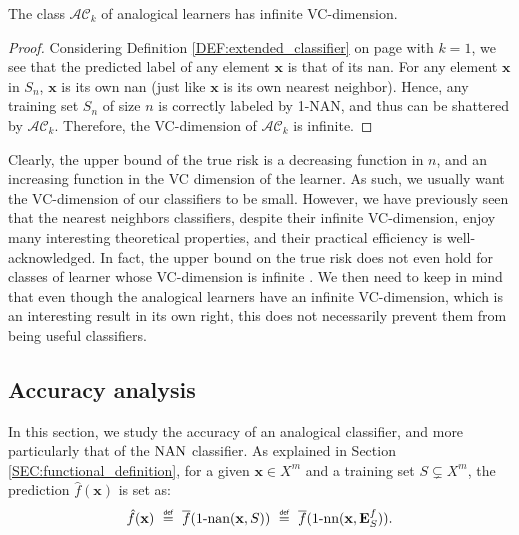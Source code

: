 \begin{proposition}
  \label{PROPOS:VCdim}
  The class $\mathcal{AC}_k$ of analogical learners has infinite VC-dimension.
\end{proposition}
\begin{proof}
  Considering Definition \ref{DEF:extended_classifier} on page
  \pageref{DEF:extended_classifier} with $k = 1$, we see
  that the predicted label of any element $\mathbf{x}$ is that of its nan. For
  any element $\mathbf{x}$ in $S_n$, $\mathbf{x}$ is its own nan (just like
  $\mathbf{x}$ is its own nearest neighbor). Hence, any training set $S_n$ of
  size $n$ is correctly labeled by 1-NAN, and thus can be shattered by
  $\mathcal{AC}_k$. Therefore, the VC-dimension of $\mathcal{AC}_k$ is infinite.
\end{proof}

Clearly, the upper bound of the true risk is a decreasing function in $n$, and an increasing
function in the VC dimension of the learner. As such, we usually want the
VC-dimension of our classifiers to be small. However, we have previously seen
that the nearest neighbors classifiers, despite their infinite
VC-dimension, enjoy many interesting theoretical properties, and their
practical efficiency is well-acknowledged. In fact, the upper bound on the true
risk does not even hold for classes of learner whose VC-dimension is infinite
\cite{Bur98}. We then need to keep in mind that even though the analogical
learners have an infinite VC-dimension, which is an interesting result in its
own right, this does not necessarily prevent them from being useful
classifiers.

\subsection{Accuracy analysis}
\label{SEC:accuracy_analysis}

In this section, we study the accuracy of an analogical classifier, and more
particularly that of the $\mbox{NAN}$ classifier. As explained in Section
\ref{SEC:functional_definition}, for a given $\mathbf{x} \in X^m$ and a
training set $S \subsetneq X^m$, the prediction $\hat{f}(\mathbf{x})$ is set as:
$$
\hat{f}(\mathbf{x}) ~ \eqdef ~ \albl{\nan(\mathbf{x}, S)} ~ \eqdef ~
\albl{\nn(\mathbf{x}, \esf)}.
$$

